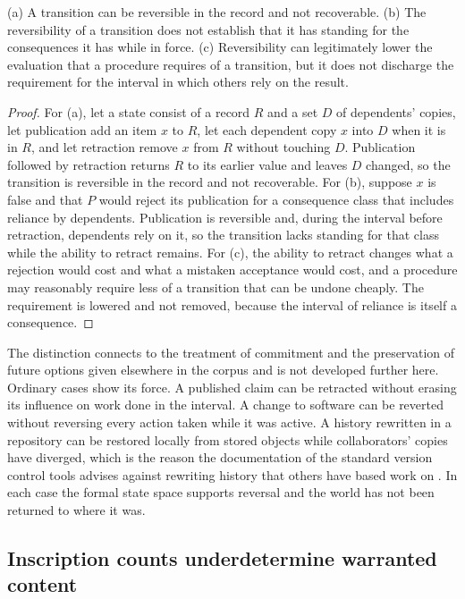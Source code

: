 \begin{proposition}\label{prop:four}
(a) A transition can be reversible in the record and not recoverable. (b) The reversibility of a transition does not establish that it has standing for the consequences it has while in force. (c) Reversibility can legitimately lower the evaluation that a procedure requires of a transition, but it does not discharge the requirement for the interval in which others rely on the result.
\end{proposition}

\begin{proof}
For (a), let a state consist of a record $R$ and a set $D$ of dependents' copies, let publication add an item $x$ to $R$, let each dependent copy $x$ into $D$ when it is in $R$, and let retraction remove $x$ from $R$ without touching $D$. Publication followed by retraction returns $R$ to its earlier value and leaves $D$ changed, so the transition is reversible in the record and not recoverable. For (b), suppose $x$ is false and that $P$ would reject its publication for a consequence class that includes reliance by dependents. Publication is reversible and, during the interval before retraction, dependents rely on it, so the transition lacks standing for that class while the ability to retract remains. For (c), the ability to retract changes what a rejection would cost and what a mistaken acceptance would cost, and a procedure may reasonably require less of a transition that can be undone cheaply. The requirement is lowered and not removed, because the interval of reliance is itself a consequence.
\end{proof}

The distinction connects to the treatment of commitment and the preservation of future options given elsewhere in the corpus \cite{admiss} and is not developed further here. Ordinary cases show its force. A published claim can be retracted without erasing its influence on work done in the interval. A change to software can be reverted without reversing every action taken while it was active. A history rewritten in a repository can be restored locally from stored objects while collaborators' copies have diverged, which is the reason the documentation of the standard version control tools advises against rewriting history that others have based work on \cite{gitrebase}. In each case the formal state space supports reversal and the world has not been returned to where it was.

\subsection*{Inscription counts underdetermine warranted content}

